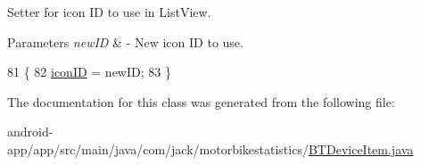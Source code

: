 Setter for icon ID to use in List\+View. 


\begin{DoxyParams}{Parameters}
{\em new\+ID} & -\/ New icon ID to use. \\
\hline
\end{DoxyParams}

\begin{DoxyCode}
81                                      \{
82         \hyperlink{class_android_app_1_1_b_t_device_item_aa008dfacbd2f948952a14bed413d5969}{iconID} = newID;
83     \}
\end{DoxyCode}


The documentation for this class was generated from the following file\+:\begin{DoxyCompactItemize}
\item 
android-\/app/app/src/main/java/com/jack/motorbikestatistics/\hyperlink{_b_t_device_item_8java}{B\+T\+Device\+Item.\+java}\end{DoxyCompactItemize}

